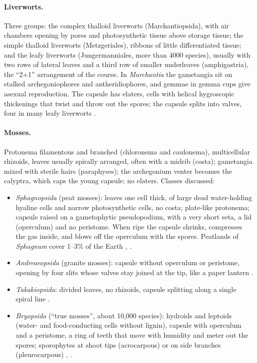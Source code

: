 \paragraph{Liverworts.}
Three groups: the complex thalloid
liverworts (Marchantiopsida), with air
chambers opening by pores and
photosynthetic tissue above storage tissue;
the simple thalloid liverworts
(Metzgeriales), ribbons of little
differentiated tissue; and the leafy
liverworts (Jungermanniales, more than 4000
species), usually with two rows of lateral
leaves and a third row of smaller
underleaves (amphigastria), the ``2+1''
arrangement of the course. In
\emph{Marchantia} the gametangia sit on
stalked archegoniophores and
antheridiophores, and gemmae in gemma cups
give asexual reproduction. The capsule has
elaters, cells with helical hygroscopic
thickenings that twist and throw out the
spores; the capsule splits into valves,
four in many leafy liverworts
\cite[Chapter 16]{evert2013raven}.

\paragraph{Mosses.}
Protonema filamentous and branched
(chloronema and caulonema), multicellular
rhizoids, leaves usually spirally arranged,
often with a midrib (costa); gametangia
mixed with sterile hairs (paraphyses); the
archegonium venter becomes the calyptra,
which caps the young capsule; no elaters.
Classes discussed:
\begin{itemize}
\item \emph{Sphagnopsida} (peat mosses):
leaves one cell thick, of large dead
water-holding hyaline cells and narrow
photosynthetic cells, no costa; plate-like
protonema; capsule raised on a
gametophytic pseudopodium, with a very short
seta, a lid (operculum) and no peristome.
When ripe the capsule shrinks, compresses
the gas inside, and blows off the operculum
with the spores. Peatlands of
\emph{Sphagnum} cover 1--3\% of the Earth
\cite[Chapter 16]{evert2013raven},
\cite[Chapter 2-5]{glime2013bryophyte}.
\item \emph{Andreaeopsida} (granite
mosses): capsule without operculum or
peristome, opening by four slits whose
valves stay joined at the tip, like a paper
lantern
\cite[Chapter 2-6]{glime2013bryophyte}.
\item \emph{Takakiopsida}: divided leaves,
no rhizoids, capsule splitting along a
single spiral line
\cite[Chapter 2-4]{glime2013bryophyte}.
\item \emph{Bryopsida} (``true mosses'',
about 10,000 species): hydroids and
leptoids (water- and food-conducting cells
without lignin), capsule with operculum and
a peristome, a ring of teeth that move with
humidity and meter out the spores;
sporophytes at shoot tips (acrocarpous) or
on side branches (pleurocarpous)
\cite[Chapter 16]{evert2013raven},
\cite[Chapter 2-7]{glime2013bryophyte}.
\end{itemize}

